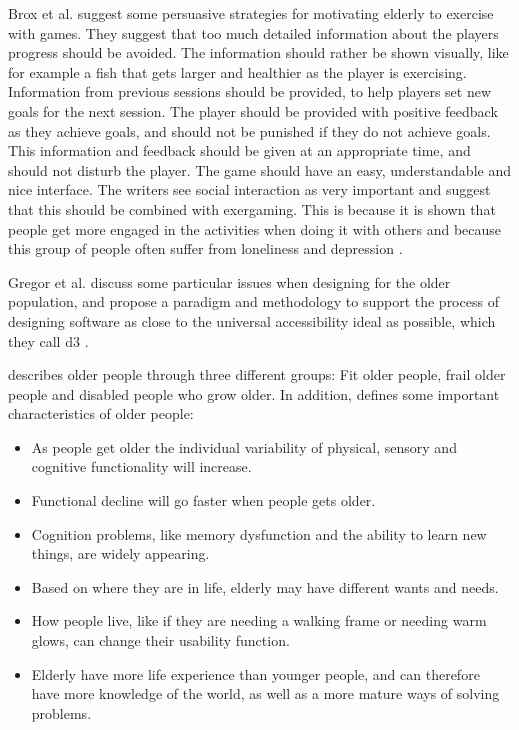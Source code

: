 Brox et al. \cite{exergamesforelderly} suggest some persuasive strategies for motivating elderly to exercise with games. They suggest that too much detailed information about the players progress should be avoided. The information should rather be shown visually, like for example a fish that gets larger and healthier as the player is exercising. Information from previous sessions should be provided, to help players set new goals for the next session. The player should be provided with positive feedback as they achieve goals, and should not be punished if they do not achieve goals. This information and feedback should be given at an appropriate time, and should not  disturb the player. The game should have an easy, understandable and nice interface. The writers see social interaction as very important and suggest that this should be combined with exergaming. This is because it is shown that people get more engaged in the activities when doing it with others and because this group of people often suffer from loneliness and depression \cite{exergamesforelderly}. 

Gregor et al. \cite{gregor} discuss some particular issues when designing for the older population, and propose a paradigm and methodology to support the process of designing software as close to the universal accessibility ideal as possible, which they call \ac{d3} \cite{gregor}.

\cite{gregor} describes older people through three different groups: Fit older people, frail older people and disabled people who grow older. In addition, \cite{gregor} defines some important characteristics of older people:
\begin{itemize}
\item As people get older the individual variability of physical, sensory and cognitive functionality will increase. 
\item Functional decline will go faster when people gets older. 
\item Cognition problems, like memory dysfunction and the ability to learn new things, are widely appearing.
\item Based on where they are in life, elderly may have different wants and needs. 
\item How people live, like if they are needing a walking frame or needing warm glows, can change their usability function.
\item Elderly have more life experience than younger people, and can therefore have more knowledge of the world, as well as a more mature ways of solving problems. 
\end{itemize}

